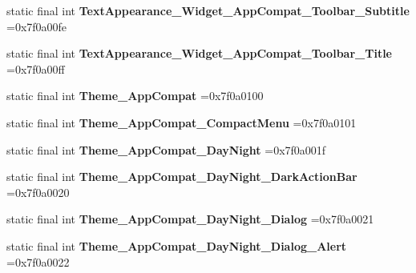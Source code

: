 \begin{DoxyCompactItemize}
\item 
\mbox{\label{classproject4_1_1xaria_1_1R_1_1style_aa0b675bff9698d907eb83ed0ad05d904}} 
static final int {\bfseries Text\+Appearance\+\_\+\+Widget\+\_\+\+App\+Compat\+\_\+\+Toolbar\+\_\+\+Subtitle} =0x7f0a00fe
\item 
\mbox{\label{classproject4_1_1xaria_1_1R_1_1style_a1cde1fefc16118efa38c9f0179bb802f}} 
static final int {\bfseries Text\+Appearance\+\_\+\+Widget\+\_\+\+App\+Compat\+\_\+\+Toolbar\+\_\+\+Title} =0x7f0a00ff
\item 
\mbox{\label{classproject4_1_1xaria_1_1R_1_1style_a38e2e41a1a5a258c84bc4091da15fd59}} 
static final int {\bfseries Theme\+\_\+\+App\+Compat} =0x7f0a0100
\item 
\mbox{\label{classproject4_1_1xaria_1_1R_1_1style_a1fbc55fd9ef6e7316b8346fb6f5108f0}} 
static final int {\bfseries Theme\+\_\+\+App\+Compat\+\_\+\+Compact\+Menu} =0x7f0a0101
\item 
\mbox{\label{classproject4_1_1xaria_1_1R_1_1style_a641ac7bfdbff192f06c265ec25ecb982}} 
static final int {\bfseries Theme\+\_\+\+App\+Compat\+\_\+\+Day\+Night} =0x7f0a001f
\item 
\mbox{\label{classproject4_1_1xaria_1_1R_1_1style_a521b19c59d4513dcbadd5ac960c74a9a}} 
static final int {\bfseries Theme\+\_\+\+App\+Compat\+\_\+\+Day\+Night\+\_\+\+Dark\+Action\+Bar} =0x7f0a0020
\item 
\mbox{\label{classproject4_1_1xaria_1_1R_1_1style_a8220d729d60762b3285e752c55c1f0b5}} 
static final int {\bfseries Theme\+\_\+\+App\+Compat\+\_\+\+Day\+Night\+\_\+\+Dialog} =0x7f0a0021
\item 
\mbox{\label{classproject4_1_1xaria_1_1R_1_1style_a8d36e8e7d080cf20c312d335e6dc506f}} 
static final int {\bfseries Theme\+\_\+\+App\+Compat\+\_\+\+Day\+Night\+\_\+\+Dialog\+\_\+\+Alert} =0x7f0a0022
\item 
\mbox{\label{classproject4_1_1xaria_1_1R_1_1style_a0a4b5a59eeb9a1c4ff00169d16e9417a}} 

\end{DoxyCompactItemize}
